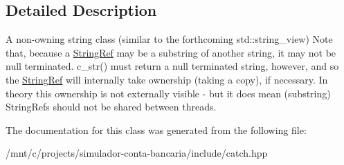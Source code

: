 \subsection{Detailed Description}
A non-\/owning string class (similar to the forthcoming std\+::string\+\_\+view) Note that, because a \hyperlink{classCatch_1_1StringRef}{String\+Ref} may be a substring of another string, it may not be null terminated. c\+\_\+str() must return a null terminated string, however, and so the \hyperlink{classCatch_1_1StringRef}{String\+Ref} will internally take ownership (taking a copy), if necessary. In theory this ownership is not externally visible -\/ but it does mean (substring) String\+Refs should not be shared between threads. 

The documentation for this class was generated from the following file\+:\begin{DoxyCompactItemize}
\item 
/mnt/c/projects/simulador-\/conta-\/bancaria/include/catch.\+hpp\end{DoxyCompactItemize}
